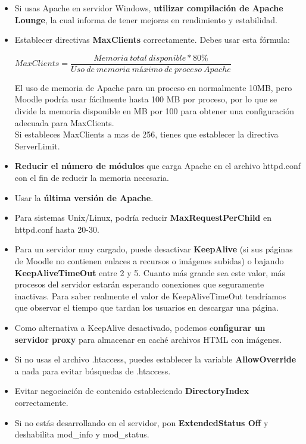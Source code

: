 	\begin{itemize}
		\item Si usas Apache en servidor Windows, \textbf{utilizar compilación de Apache Lounge}, la cual informa de tener mejoras en rendimiento y estabilidad.
		\item Establecer directivas \textbf{MaxClients} correctamente. Debes usar esta fórmula:	
		\begin{center}
			\begin{math}			
				MaxClients = \dfrac{Memoria\ total\ disponible * 80\%}{Uso\ de\ memoria\ máximo\ de\ proceso\ Apache}	
			\end{math}
		\end{center}
		El uso de memoria de Apache para un proceso en normalmente 10MB, pero Moodle podría usar fácilmente hasta 100 MB por proceso, por lo que se divide la memoria disponible en MB por 100 para obtener una configuración adecuada para MaxClients.\\
		Si estableces MaxClients a mas de 256, tienes que establecer la directiva ServerLimit.
		\item \textbf{Reducir el número de módulos} que carga Apache en el archivo httpd.conf con el fin de reducir la memoria necesaria.
		\item Usar la \textbf{última versión de Apache}.
		\item Para sistemas Unix/Linux, podría reducir \textbf{MaxRequestPerChild} en httpd.conf hasta 20-30.
		\item Para un servidor muy cargado, puede desactivar \textbf{KeepAlive} (si sus páginas de Moodle no contienen enlaces a recursos o imágenes subidas) o bajando \textbf{KeepAliveTimeOut} entre 2 y 5. Cuanto más grande sea este valor, más procesos del servidor estarán esperando conexiones que seguramente inactivas. Para saber realmente el valor de KeepAliveTimeOut tendríamos que observar el tiempo que tardan los usuarios en descargar una página.
		\item Como alternativa a KeepAlive desactivado, podemos c\textbf{onfigurar un servidor proxy} para almacenar en caché archivos HTML con imágenes.
		\item Si no usas el archivo .htaccess, puedes establecer la variable \textbf{AllowOverride} a nada para evitar búsquedas de .htaccess. 
		\item Evitar negociación de contenido estableciendo \textbf{DirectoryIndex} correctamente.
		\item Si no estás desarrollando en el servidor, pon \textbf{ExtendedStatus Off} y deshabilita mod\_info y mod\_status.

\end{itemize}
